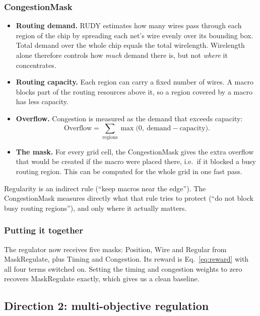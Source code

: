 \documentclass{article}
\begin{document}
\subsubsection{CongestionMask}
\begin{itemize}
  \item \textbf{Routing demand.} RUDY \citep{spindler2007rudy} estimates how many wires pass through each
  region of the chip by spreading each net's wire evenly over its bounding box. Total demand over the
  whole chip equals the total wirelength. Wirelength alone therefore controls how \emph{much} demand
  there is, but not \emph{where} it concentrates.
  \item \textbf{Routing capacity.} Each region can carry a fixed number of wires. A macro blocks part of
  the routing resources above it, so a region covered by a macro has less capacity.
  \item \textbf{Overflow.} Congestion is measured as the demand that exceeds capacity:
  \begin{equation}
  \text{Overflow}=\sum_{\text{regions}}\max\big(0,\ \text{demand}-\text{capacity}\big).
  \end{equation}
  \item \textbf{The mask.} For every grid cell, the CongestionMask gives the extra overflow that would
  be created if the macro were placed there, i.e.\ if it blocked a busy routing region. This can be
  computed for the whole grid in one fast pass.
\end{itemize}
Regularity is an indirect rule (``keep macros near the edge''). The CongestionMask measures directly
what that rule tries to protect (``do not block busy routing regions''), and only where it actually
matters.

\subsubsection{Putting it together}
The regulator now receives five masks: Position, Wire and Regular from MaskRegulate, plus Timing and
Congestion. Its reward is Eq.~\eqref{eq:reward} with all four terms switched on. Setting the timing and
congestion weights to zero recovers MaskRegulate exactly, which gives us a clean baseline.

\subsection{Direction 2: multi-objective regulation}
\label{sec:d2}
\end{document}
